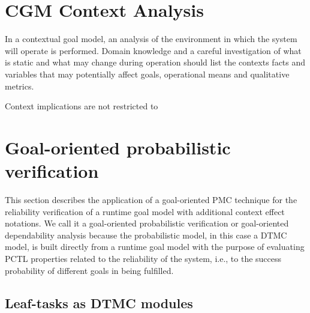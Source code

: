 \section{CGM Context Analysis}

In a contextual goal model, an analysis of the environment in which the system will operate is performed. Domain knowledge and a careful investigation of what is static and what may change during operation should list the contexts facts and variables that may potentially affect goals, operational means and qualitative metrics.

Context implications are not restricted to 

\section{Goal-oriented probabilistic verification}\label{ssec:NFR-verification}


This section describes the application of a goal-oriented PMC technique for the reliability verification of a runtime goal model with additional context effect notations. We call it a goal-oriented probabilistic verification or goal-oriented dependability analysis because the probabilistic model, in this case a DTMC model, is built directly from a runtime goal model with the purpose of evaluating PCTL properties related to the reliability of the system, i.e., to the success probability of different goals in being fulfilled.


\subsection{Leaf-tasks as DTMC modules}


